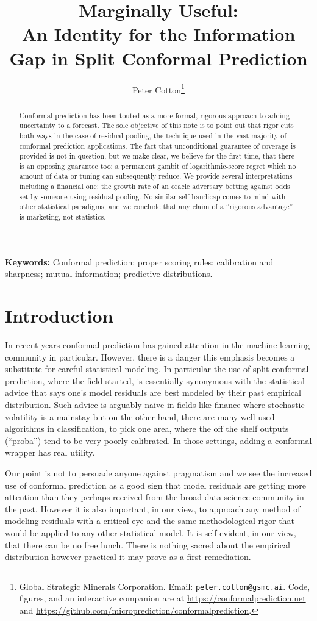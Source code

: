 \documentclass[11pt]{article}
\title{Marginally Useful:\\ An Identity for the Information Gap in Split Conformal Prediction}
\author{}
\author{Peter Cotton\thanks{Global Strategic Minerals Corporation.
    Email: \texttt{peter.cotton@gsmc.ai}. Code, figures, and an interactive
    companion are at \url{https://conformalprediction.net} and
    \url{https://github.com/microprediction/conformalprediction}.}}
\date{}
\theoremstyle{definition}
\begin{document}
\doublespacing
\maketitle

\begin{abstract}
\noindent
Conformal prediction has been touted as a more formal, rigorous approach to adding
uncertainty to a forecast. The sole objective of this note is to point out that
rigor cuts both ways in the case of residual pooling, the technique used in the 
vast majority of conformal prediction applications. The fact that unconditional 
guarantee of coverage is provided is not in question, but we make clear, we believe for the first
time, that there is an opposing guarantee too: a permanent gambit of logarithmic-score
regret which no amount of data or tuning can subsequently reduce. We provide several 
interpretations including a financial one: the growth rate of an oracle adversary betting
against odds set by someone using residual pooling. No similar self-handicap comes to mind with
other statistical paradigms, and we conclude that any claim of a ``rigorous advantage'' is marketing, not statistics. 
\end{abstract}

\noindent\textbf{Keywords:} Conformal prediction; proper scoring rules; calibration and
sharpness; mutual information; predictive distributions.

\section{Introduction}

In recent years conformal prediction has gained attention in the machine learning community in particular. However, there is
a danger this emphasis becomes a substitute for careful statistical modeling. In particular the use of 
split conformal prediction, where the field started, is essentially synonymous with the statistical advice that says
one's model residuals are best modeled by their past empirical distribution. Such advice is arguably naive in 
fields like finance where stochastic volatility is a mainstay but on the other hand, there are many well-used 
algorithms in classification, to pick one area, where the off the shelf outputs (``proba'') tend to be very poorly calibrated. In those 
settings, adding a conformal wrapper has real utility. 

Our point is not to persuade anyone against pragmatism and we see the increased use of conformal prediction as a good sign that 
model residuals are getting more attention than they perhaps received from the broad data science community in the past. However it is
also important, in our view, to approach any method of modeling residuals with a critical eye and the same methodological rigor that would
be applied to any other statistical model. It is self-evident, in our view, that there can be no free lunch. There is nothing sacred about the 
empirical distribution however practical it may prove as a first remediation.
\end{document}

